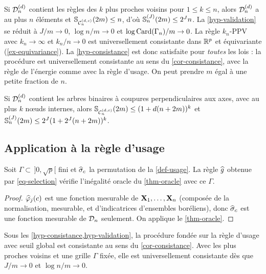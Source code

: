 \begin{exemple}\label{ex-nn}
Si $\mathcal{D}_n^{(d)}$ contient les règles des $k$ plus proches voisins pour $1\le k\le n$, alors $\mathcal{D}_n^{(d)}$ a au plus $n$ éléments et $\mathbb{S}_{\mathcal{C}_n^{(d,c)}}(2m)\le n$, d'où $\mathbb{S}^{(J)}_n(2m)\le2^Jn$. La \cref{hyp-validation} se réduit à $J/m\to0$, $\log n/m\to0$ et $\log\operatorname{Card}(\Gamma_n)/m\to0$. La règle $k_n$-PPV avec $k_n\to\infty$ et $k_n/n\to0$ est universellement consistante dans $\mathbb{R}^p$ \citep{stone1977consistent} et équivariante (\cref{ex-equivariance}). La \cref{hyp-consistance} est donc satisfaite pour \emph{toutes} les lois : la procédure est universellement consistante au sens du \cref{cor-consistance}, avec la règle de l'énergie comme avec la règle d'usage. On peut prendre $m$ égal à une petite fraction de $n$.
\end{exemple}

\begin{exemple}[Arbres]\label{ex-arbres}
Si $\mathcal{D}_n^{(d)}$ contient les arbres binaires à coupures perpendiculaires aux axes, avec au plus $k$ nœuds internes, alors $\mathbb{S}_{\mathcal{C}_n^{(d,c)}}(2m)\le(1+d(n+2m))^k$ \citep[chapitre 20]{devroye1996probabilistic} et $\mathbb{S}^{(J)}_n(2m)\le2^J(1+2^J(n+2m))^k$.
\end{exemple}

\subsection{Application à la règle d'usage}

\begin{theoreme}\label{thm-oracle-usage}
Soit $\Gamma\subset\,]0,\sqrt p[$ fini et $\widehat{\sigma}_c$ la permutation de la \cref{def-usage}. La règle $\widehat{g}$ obtenue par \eqref{eq-selection} vérifie l'inégalité oracle du \cref{thm-oracle} avec ce $\Gamma$.
\end{theoreme}

\begin{proof}
$\widehat{\varphi}_j(c)$ est une fonction mesurable de $\mathbf{X}_1,\dots,\mathbf{X}_n$ (composée de la normalisation, mesurable, et d'indicatrices d'ensembles boréliens), donc $\widehat{\sigma}_c$ est une fonction mesurable de $\mathcal{D}_n$ seulement. On applique le \cref{thm-oracle}.
\end{proof}

\begin{corollaire}\label{cor-consistance-usage}
Sous les \cref{hyp-consistance,hyp-validation}, la procédure fondée sur la règle d'usage avec seuil global est consistante au sens du \cref{cor-consistance}. Avec les plus proches voisins et une grille $\Gamma$ fixée, elle est universellement consistante dès que $J/m\to0$ et $\log n/m\to0$.
\end{corollaire}

